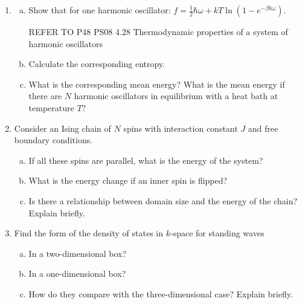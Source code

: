 \documentclass[9pt,a4paper,twocolumn]{article}
\begin{document}
\begin{enumerate}[1.]
\begin{enumerate}[(a)]
	\end{enumerate}
	
	\item
	\begin{enumerate}[(a)]
	
		\item Show that for one harmonic oscillator: $f = \frac{1}{2}\hbar\omega + kT\ln(1 - e^{-\beta\hbar\omega})$.
		
		REFER TO P48 PS08 4.28 Thermodynamic properties of a system of harmonic oscillators
		
		\item Calculate the corresponding entropy.
		
		\item What is the corresponding mean energy? What is the mean energy if there are $N$ harmonic oscillators in equilibrium with a heat bath at temperature $T$?
	
	\end{enumerate}
	
	\item Consider an Ising chain of $N$ spins with interaction constant $J$ and free boundary conditions.
	\begin{enumerate}[(a)]
	
		\item If all these spins are parallel, what is the energy of the system?
		
		\item What is the energy change if an inner spin is flipped?
		
		\item Is there a relationship between domain size and the energy of the chain? Explain briefly.
	
	\end{enumerate}
	
	\item Find the form of the density of states in $k$-space for standing waves
	\begin{enumerate}[(a)]
	
		\item In a two-dimensional box?
		
		\item In a one-dimensional box?
		
		\item How do they compare with the three-dimensional case? Explain briefly.
		
	\end{enumerate}

\end{enumerate}
\end{document}

